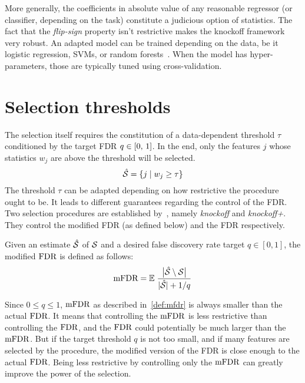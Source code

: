 More generally, the coefficients in absolute value of any reasonable regressor
(or classifier, depending on the task) constitute a judicious option of statistics.
The fact that the \emph{flip-sign} property isn't restrictive makes the knockoff framework very robust.
An adapted model can be trained depending on the data, be it logistic regression,
SVMs, or random forests~\cite{random_forests}.
When the model has hyper-parameters, those are typically tuned using cross-validation.

\section{Selection thresholds}\label{sec:kfs}

The selection itself requires the constitution of a data-dependent threshold $\tau$
conditioned by the target FDR $q \in \left[ 0,\, 1 \right]$.
In the end, only the features $j$ whose statistics $w_j$ are above the threshold will be selected.
\begin{equation}
    \hat{\mathcal{S}} = \left\{ j \mid w_j \geq \tau \right\}
\end{equation}
The threshold $\tau$ can be adapted depending on how restrictive the procedure ought to be.
It leads to different guarantees regarding the control of the FDR\@.
Two selection procedures are established by~\cite{fixed_x_knockoffs},
namely \emph{knockoff} and \emph{knockoff+}.
They control the modified FDR (as defined below) and the FDR respectively.
\begin{definition}\label{def:mfdr}
Given an estimate $\hat{\mathcal{S}}$ of $\mathcal{S}$ and a desired false discovery rate target $q \in [0, 1]$,
the modified $\text{FDR}$ is defined as follows:
\begin{equation*}
    \text{mFDR} = {\mathbb E}\left.
        \frac
            {\big\lvert \hat{\mathcal{S}} \setminus \mathcal{S} \big\rvert}
            {\lvert\hat{\mathcal{S}}\rvert + 1 / q}
    \right.
\end{equation*}
\end{definition}
Since $0 \leq q \leq 1$, $\text{mFDR}$ as described in~\ref{def:mfdr} is always smaller than the actual $\text{FDR}$.
It means that controlling the $\text{mFDR}$ is less restrictive than controlling the $\text{FDR}$,
and the $\text{FDR}$ could potentially be much larger than the $\text{mFDR}$.
But if the target threshold $q$ is not too small, and if many features are selected by the procedure,
the modified version of the FDR is close enough to the actual $\text{FDR}$.
Being less restrictive by controlling only the $\text{mFDR}$ can greatly improve the power
of the selection.

